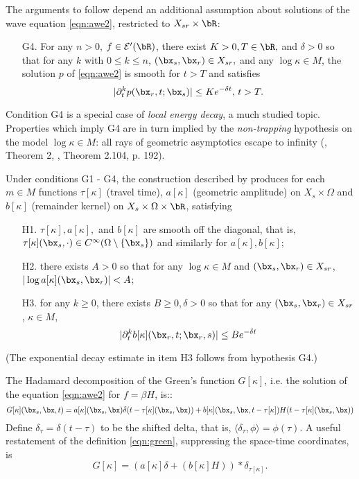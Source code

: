 The arguments to follow depend an additional assumption about solutions of
the wave equation \ref{eqn:awe2}, restricted to $X_{sr}\times \bR$:
\begin{itemize}
\item[G4. ] For any $n > 0$, $f \in {\cal E}'(\bR)$, there exist $K >
  0, T \in \bR,$ and $\delta>0$ so
  that for any $k$ with $0 \le k \le n$, $(\bx_s,\bx_r) \in
 X_{sr},$
  and any $\log \kappa \in M$, the solution $p$ of \ref{eqn:awe2} is smooth
  for $t>T$ and satisfies
  \[
    |\partial_t^k p(\bx_r,t;\bx_s)| \le K e^{-\delta t}, \, t > T.
  \]
\end{itemize}
Condition G4 is a special case of {\em local energy decay}, a much
studied topic. Properties which imply G4 are in turn implied by the
{\em non-trapping} hypothesis on the model $\log \kappa \in M$: all rays of
geometric asymptotics escape to infinity (\cite{Hristova:09}, Theorem
2, \cite{EgorovShubin}, Theorem 2.104, p. 192).

Under conditions G1 - G4, the construction described by
\cite{Friedlander:75} produces for each $m \in M$ functions $\tau[\kappa]$ (travel time), $a[\kappa]$
(geometric amplitude) on $X_s \times \Omega$ and $b[\kappa]$
(remainder kernel) on $X_s \times \Omega \times \bR$, satisfying
\begin{itemize}
\item[H1. ] $\tau[\kappa], a[\kappa],$ and $b[\kappa]$ are smooth off the diagonal,
that is, $\tau[\kappa](\bx_s,\cdot) \in C^{\infty}(\Omega \setminus \{\bx_s\})$
and similarly for $a[\kappa],b[\kappa]$;
\item[H2. ] there exists $A>0$ so that for any $\log \kappa \in M$
  and $(\bx_s,\bx_r) \in X_{sr}$,
  $|\log a[\kappa](\bx_s,\bx_r)| < A$;
\item[H3. ] for any $k \ge 0$, there exists $B \ge 0,\delta > 0$ so
  that for any $(\bx_s,\bx_r) \in X_{sr}$, $\kappa \in M$, 
\begin{equation}
  |\partial^k_t b[\kappa](\bx_r,t;\bx_r,s)| \le B e^{-\delta t}
  \label{eqn:best}
\end{equation}
\end{itemize}
(The exponential decay estimate in item H3 follows from hypothesis G4.)

The Hadamard
decomposition of the Green's function $G[\kappa]$, i.e. the solution of the
equation \ref{eqn:awe2} for $f = \beta H$, is::
\begin{equation}
  \label{eqn:green}
  G[\kappa](\bx_s,\bx,t) = a[\kappa](\bx_s,\bx)\delta(t - \tau[\kappa](\bx_s,\bx)) +
  b[\kappa](\bx_s,\bx,t-\tau[\kappa])H(t - \tau[\kappa](\bx_s,\bx))
\end{equation}
Define $\delta_{\tau} = \delta(t-\tau)$ to be the shifted delta, that
is, $\langle \delta_{\tau},\phi\rangle = \phi(\tau)$. A useful
restatement of the definition \ref{eqn:green}, suppressing the
space-time coordinates, is
\begin{equation}
  \label{eqn:regreen}
  G[\kappa] = (a[\kappa]\delta +  (b[\kappa]H))*\delta_{\tau[\kappa]}.
\end{equation}

